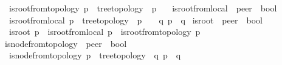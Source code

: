 \begin{isabellebody}
\ \ {\isachardoublequoteopen}is{\isacharunderscore}{\kern0pt}root{\isacharunderscore}{\kern0pt}from{\isacharunderscore}{\kern0pt}topology\ p\ {\isasymequiv}\ {\isacharparenleft}{\kern0pt}tree{\isacharunderscore}{\kern0pt}topology\ {\isasymand}\ {\isasymG}{\isasymlangle}{\isasymrightarrow}p{\isasymrangle}\ {\isacharequal}{\kern0pt}\ {\isacharbraceleft}{\kern0pt}{\isacharbraceright}{\kern0pt}{\isacharparenright}{\kern0pt}{\isachardoublequoteclose}\isanewline
\isanewline
{}\isamarkupfalse%
\ is{\isacharunderscore}{\kern0pt}root{\isacharunderscore}{\kern0pt}from{\isacharunderscore}{\kern0pt}local\ {\isacharcolon}{\kern0pt}{\isacharcolon}{\kern0pt}\ {\isachardoublequoteopen}{\isacharprime}{\kern0pt}peer\ {\isasymRightarrow}\ bool{\isachardoublequoteclose}\ \ \isanewline
\ \ {\isachardoublequoteopen}is{\isacharunderscore}{\kern0pt}root{\isacharunderscore}{\kern0pt}from{\isacharunderscore}{\kern0pt}local\ p\ {\isasymequiv}\ tree{\isacharunderscore}{\kern0pt}topology\ {\isasymand}\ {\isasymP}\isactrlsub {\isacharquery}{\kern0pt}{\isacharparenleft}{\kern0pt}p{\isacharparenright}{\kern0pt}\ {\isacharequal}{\kern0pt}\ {\isacharbraceleft}{\kern0pt}{\isacharbraceright}{\kern0pt}\ {\isasymand}\ {\isacharparenleft}{\kern0pt}{\isasymforall}q{\isachardot}{\kern0pt}\ p\ {\isasymnotin}\ {\isasymP}\isactrlsub {\isacharbang}{\kern0pt}{\isacharparenleft}{\kern0pt}q{\isacharparenright}{\kern0pt}{\isacharparenright}{\kern0pt}{\isachardoublequoteclose}\isanewline
\isanewline
{}\isamarkupfalse%
\ is{\isacharunderscore}{\kern0pt}root\ {\isacharcolon}{\kern0pt}{\isacharcolon}{\kern0pt}\ {\isachardoublequoteopen}{\isacharprime}{\kern0pt}peer\ {\isasymRightarrow}\ bool{\isachardoublequoteclose}\ \ \isanewline
\ \ {\isachardoublequoteopen}is{\isacharunderscore}{\kern0pt}root\ p\ {\isasymequiv}\ is{\isacharunderscore}{\kern0pt}root{\isacharunderscore}{\kern0pt}from{\isacharunderscore}{\kern0pt}local\ p\ {\isasymor}\ is{\isacharunderscore}{\kern0pt}root{\isacharunderscore}{\kern0pt}from{\isacharunderscore}{\kern0pt}topology\ p{\isachardoublequoteclose}\isanewline
\ \ \isanewline
\isanewline
{}\isamarkupfalse%
\ is{\isacharunderscore}{\kern0pt}node{\isacharunderscore}{\kern0pt}from{\isacharunderscore}{\kern0pt}topology\ {\isacharcolon}{\kern0pt}{\isacharcolon}{\kern0pt}\ {\isachardoublequoteopen}{\isacharprime}{\kern0pt}peer\ {\isasymRightarrow}\ bool{\isachardoublequoteclose}\ \isanewline
\ \ {\isachardoublequoteopen}is{\isacharunderscore}{\kern0pt}node{\isacharunderscore}{\kern0pt}from{\isacharunderscore}{\kern0pt}topology\ p\ {\isasymequiv}\ {\isacharparenleft}{\kern0pt}tree{\isacharunderscore}{\kern0pt}topology\ {\isasymand}\ {\isacharparenleft}{\kern0pt}{\isasymexists}q{\isachardot}{\kern0pt}\ {\isasymG}{\isasymlangle}{\isasymrightarrow}p{\isasymrangle}\ {\isacharequal}{\kern0pt}\ {\isacharbraceleft}{\kern0pt}q{\isacharbraceright}{\kern0pt}{\isacharparenright}{\kern0pt}{\isacharparenright}{\kern0pt}{\isachardoublequoteclose}\isanewline

\end{isabellebody}
